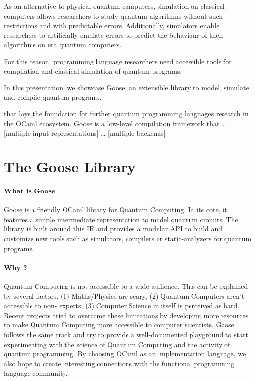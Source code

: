 \documentclass[a4paper]{easychair}
\begin{document}
As an alternative to physical quantum computers, simulation on classical computers allows researchers to study quantum algorithms without such restrictions and with predictable errors. Additionally, simulators enable researchers to artificially emulate errors to predict the behaviour of their algorithms on \nisq era quantum computers.

For this reason, programming language researchers need accessible tools for compilation and classical simulation of quantum programs.

In this presentation, we showcase Goose: an extensible library to model, simulate and compile quantum programs.

that lays the foundation for further quantum programming languages research in the OCaml ecosystem. Goose is a low-level compilation framework that … [multiple input representations] … [multiple backends]

\section{The Goose Library}

\paragraph*{What is Goose} Goose is a friendly OCaml library for Quantum Computing. In its core, it features a simple intermediate representation to model quantum circuits. The library is built around this IR and provides a modular API to build and customize new tools such as simulators, compilers or static-analyzers for quantum programs.

\paragraph*{Why ?} Quantum Computing is not accessible to a wide audience. This can be explained by several factors. (1) Maths/Physics are scary, (2) Quantum Computers aren't accessible to non- experts, (3) Computer Science in itself is perceived as hard.
Recent projects \cite{} tried to overcome these limitations by developing more resources to make Quantum Computing more accessible to computer scientists. Goose follows the same track and try to provide a well-documented playground to start experimenting with the science of Quantum Computing and the activity of quantum programming. By choosing OCaml as an implementation language, we also hope to create interesting connections with the functional programming language community.
\end{document}
